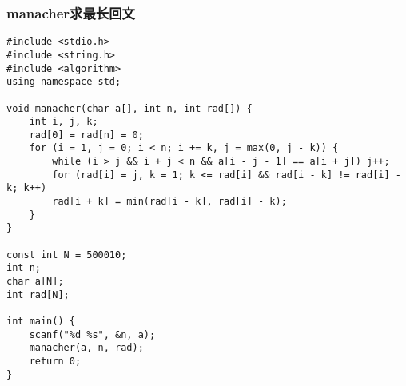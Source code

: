 \subsubsection{manacher求最长回文}
\begin{verbatim}
#include <stdio.h>
#include <string.h>
#include <algorithm>
using namespace std;

void manacher(char a[], int n, int rad[]) {
    int i, j, k;
    rad[0] = rad[n] = 0;
    for (i = 1, j = 0; i < n; i += k, j = max(0, j - k)) {
        while (i > j && i + j < n && a[i - j - 1] == a[i + j]) j++;
        for (rad[i] = j, k = 1; k <= rad[i] && rad[i - k] != rad[i] - k; k++)
        rad[i + k] = min(rad[i - k], rad[i] - k);
    }
}

const int N = 500010;
int n;
char a[N];
int rad[N];

int main() {
    scanf("%d %s", &n, a);
    manacher(a, n, rad);
    return 0;
}
\end{verbatim}
